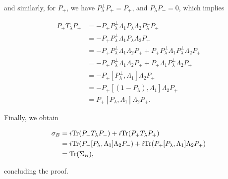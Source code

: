 \documentclass[12pt, letterpaper]{article}
\begin{document}
and similarly, for $P_+$, we have $P_\lambda^\perp P_+ = P_+$, and $P_\lambda P_- = 0$, which implies

\[\begin{aligned}
P_+ T_\lambda P_+ &=  -P_+P_\lambda^\perp \Lambda_1 P_\lambda \Lambda_2 P_\lambda^\perp P_+\\
&= -P_+P_\lambda^\perp\Lambda_1P_\lambda\Lambda_2P_+\\
&= -P_+P_\lambda^\perp\Lambda_1\Lambda_2P_+ + P_+P_\lambda^\perp\Lambda_1P_\lambda^\perp\Lambda_2P_+\\
&= -P_+P_\lambda^\perp\Lambda_1\Lambda_2P_+ + P_+\Lambda_1P_\lambda^\perp\Lambda_2P_+\\
&= -P_+[P_\lambda^\perp, \Lambda_1]\Lambda_2 P_+\\
&= -P_+[(1-P_\lambda), \Lambda_1]\Lambda_2 P_+\\
&= P_+[P_\lambda, \Lambda_1]\Lambda_2 P_+.
\end{aligned}\]

Finally, we obtain

\[\begin{aligned}
\sigma_B &= i\text{Tr}(P_-T_\lambda P_-) + i\text{Tr}(P_+T_\lambda P_+)\\
&= i\text{Tr}(P_-[P_\lambda,\Lambda_1]\Lambda_2 P_-) + i\text{Tr}(P_+[P_\lambda, \Lambda_1]\Lambda_2 P_+)\\
&= \text{Tr}(\Sigma_B),
\end{aligned}\]

concluding the proof.
\end{document}
